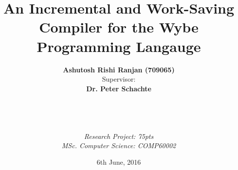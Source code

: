 \documentclass[11pt,a4paper,titlepage,twoside]{report}
\title{
  An Incremental and Work-Saving Compiler for the Wybe Programming Langauge
}
\date{6th June, 2016}
\author{
  \textbf{Ashutosh Rishi Ranjan (709065)} \\
  Supervisor: \\
  \textbf{Dr. Peter Schachte} \\ \\ \\ \\ \\ 
  \textit{Research Project: 75pts} \\
  \textit{MSc. Computer Science: COMP60002}
}
\begin{document}
\maketitle

\tableofcontents{}
\listoffigures
















\end{document}
